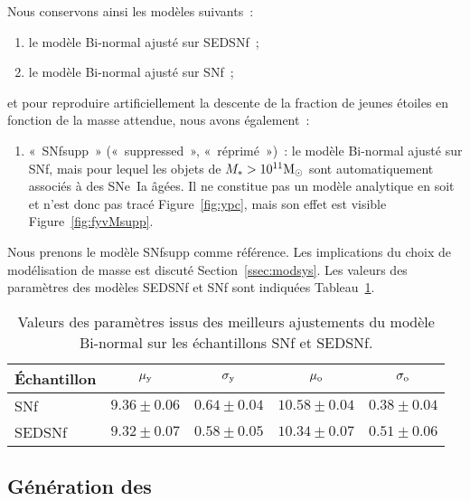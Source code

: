\documentclass[../main/main.tex]{subfiles}
\begin{document}
Nous conservons ainsi les modèles suivants~:
\begin{enumerate}
    \item le modèle Bi-normal ajusté sur SEDSNf~;
    \item le modèle Bi-normal ajusté sur SNf~;
\end{enumerate}
et pour reproduire artificiellement la descente de la fraction de jeunes étoiles
en fonction de la masse attendue, nous avons également~:
\begin{enumerate}[resume]
    \item «~SNfsupp~» («~suppressed~», «~réprimé~»)~: le modèle Bi-normal ajusté
        sur SNf, mais pour lequel les objets de $M_* > 10^{11}\si{\Msun}$ sont
        automatiquement associés à des SNe~Ia âgées. Il ne constitue pas un
        modèle analytique en soit et n'est donc pas tracé Figure~\ref{fig:ypc},
        mais son effet est visible Figure~\ref{fig:fyvMsupp}.
\end{enumerate}

Nous prenons le modèle SNfsupp comme référence. Les implications du choix de
modélisation de masse est discuté Section~\ref{ssec:modsys}. Les valeurs des
paramètres des modèles SEDSNf et SNf sont indiquées
Tableau~\ref{tab:massmodelresults}.

\begin{table}[ht]
    \centerfloat
    \caption[Valeurs des paramètres issus des meilleurs ajustements du modèle
    Bi-normal sur les échantillons SNf et SEDSNf]{Valeurs des paramètres issus
        des meilleurs ajustements du modèle Bi-normal sur les échantillons SNf
    et SEDSNf.}
    \label{tab:massmodelresults}
    \begin{tabular}{lcccc}
        \toprule
        Échantillon              &
                $\mu_{\rm y} $   &
                $\sigma_{\rm y}$ &
                $\mu_{\rm o} $   &
                $\sigma_{\rm o}$ \\
        \midrule
        SNf    & $9.36  \pm 0.06$
               & $0.64  \pm 0.04$
               & $10.58 \pm 0.04$
               & $0.38  \pm 0.04$
               \\
        SEDSNf & $9.32  \pm 0.07$
               & $0.58  \pm 0.05$
               & $10.34 \pm 0.07$
               & $0.51  \pm 0.06$
               \\
        \bottomrule
    \end{tabular}
\end{table}

\subsection{Génération des \hostlib}\label{ssec:inpgen}
\end{document}
